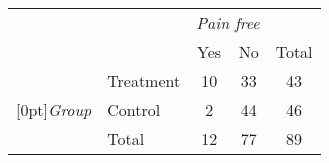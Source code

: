 \begin{tabular}{ll  cc c} 
    &           & \multicolumn{2}{c}{\textit{Pain free}} \\
\cline{3-4}
    &			& Yes 	& No 	                  & Total \\
\cline{2-5}
& Treatment 	& 10	 	& 33		                  & 43 \\
\raisebox{1.5ex}[0pt]{\emph{Group}} & Control	 	& 2	 	& 44 	 	                  & 46 \\
\cline{2-5}
& Total		& 12		& 77		                  & 89
\end{tabular}